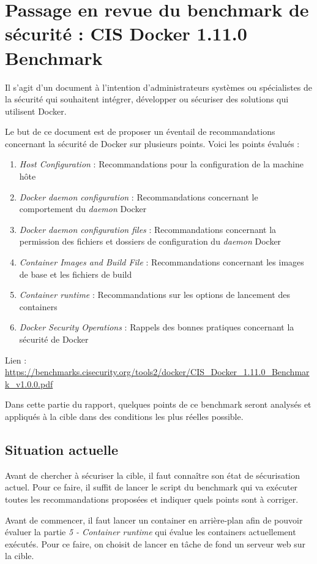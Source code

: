 \documentclass[11pt,a4paper,oneside]{report}
\begin{document}
\section{Passage en revue du benchmark de sécurité : CIS Docker 1.11.0 Benchmark}
Il s'agit d'un document à l'intention d'administrateurs systèmes ou spécialistes de la sécurité qui souhaitent intégrer, développer ou sécuriser des solutions qui utilisent Docker.

Le but de ce document est de proposer un éventail de recommandations concernant la sécurité de Docker sur plusieurs points. Voici les points évalués :
\begin{enumerate}
\item \textit{Host Configuration} : Recommandations pour la configuration de la machine hôte
\item \textit{Docker daemon configuration} : Recommandations concernant le comportement du \textit{daemon} Docker
\item \textit{Docker daemon configuration files} : Recommandations concernant la permission des fichiers et dossiers de configuration du \textit{daemon} Docker
\item \textit{Container Images and Build File} : Recommandations concernant les images de base et les fichiers de build
\item \textit{Container runtime} : Recommandations sur les options de lancement des containers
\item \textit{Docker Security Operations} : Rappels des bonnes pratiques concernant la sécurité de Docker
\end{enumerate}

Lien : \url{https://benchmarks.cisecurity.org/tools2/docker/CIS_Docker_1.11.0_Benchmark_v1.0.0.pdf}

Dans cette partie du rapport, quelques points de ce benchmark seront analysés et appliqués à la cible dans des conditions les plus réelles possible.

\subsection{Situation actuelle}
Avant de chercher à sécuriser la cible, il faut connaître son état de sécurisation actuel. Pour ce faire, il suffit de lancer le script du benchmark qui va exécuter toutes les recommandations proposées et indiquer quels points sont à corriger.

Avant de commencer, il faut lancer un container en arrière-plan afin de pouvoir évaluer la partie \textit{5 - Container runtime} qui évalue les containers actuellement exécutés. Pour ce faire, on choisit de lancer en tâche de fond un serveur web sur la cible.
\end{document}
